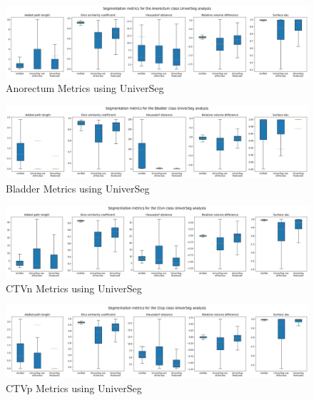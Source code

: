 \documentclass[11pt,twoside]{report}
\begin{document}
\begin{landscape}

  \begin{figure}[H]
    \centering
    \includegraphics[width=\linewidth]{../../research/source/code/data/metrics/metricsanorectum_1_combinednotable_UniverSeg_analysis.png}
    \caption{Anorectum Metrics using UniverSeg}\label{fig:universeg-metrics-anorectum}
  \end{figure}

  \begin{figure}[H]
    \centering
    \includegraphics[width=\linewidth]{../../research/source/code/data/metrics/metricsbladder_1_combinednotable_UniverSeg_analysis.png}
    \caption{Bladder Metrics using UniverSeg}\label{fig:universeg-metrics-bladder}
  \end{figure}

  \begin{figure}[H]
    \centering
    \includegraphics[width=\linewidth]{../../research/source/code/data/metrics/metricsctvn_1_combinednotable_UniverSeg_analysis.png}
    \caption{CTVn Metrics using UniverSeg}\label{fig:universeg-metrics-ctvn}
  \end{figure}

  \begin{figure}[H]
    \centering
    \includegraphics[width=\linewidth]{../../research/source/code/data/metrics/metricsctvp_1_combinednotable_UniverSeg_analysis.png}
    \caption{CTVp Metrics using UniverSeg}\label{fig:universeg-metrics-ctvp}
  \end{figure}


\end{landscape}
\end{document}
